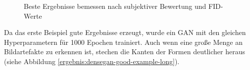 \begin{figure}[H]
	\centering
	\qquad
	\caption{Beste Ergebnisse bemessen nach subjektiver Bewertung und FID-Werte}
	\label{ergebnis:densegan-best}
\end{figure}

Da das erste Beispiel gute Ergebnisse erzeugt, wurde ein GAN mit den gleichen Hyperparametern für 1000 Epochen trainiert.
Auch wenn eine große Menge an Bildartefakte zu erkennen ist, stechen die Kanten der Formen deutlicher heraus (siehe Abbildung \ref{ergebnis:densegan-good-example-long}).

